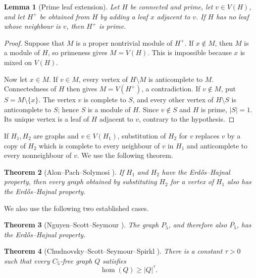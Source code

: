 \documentclass[11pt]{article}
\numberwithin{equation}{section}
\theoremstyle{plain}
\newtheorem{theorem}{Theorem}[section]
\newtheorem{lemma}[theorem]{Lemma}
\theoremstyle{definition}
\begin{document}
\begin{lemma}[Prime leaf extension]
\label{lem:prime-leaf-extension}
Let $H$ be connected and prime, let $v\in V(H)$, and let $H^+$ be
obtained from $H$ by adding a leaf $x$ adjacent to $v$.  If $H$ has no
leaf whose neighbour is $v$, then $H^+$ is prime.
\end{lemma}

\begin{proof}
Suppose that $M$ is a proper nontrivial module of $H^+$.  If $x\notin
M$, then $M$ is a module of $H$, so primeness gives $M=V(H)$.  This is
impossible because $x$ is mixed on $V(H)$.

Now let $x\in M$.  If $v\in M$, every vertex of $H\setminus M$ is
anticomplete to $M$.  Connectedness of $H$ then gives $M=V(H^+)$, a
contradiction.  If $v\notin M$, put $S=M\setminus\{x\}$.  The vertex
$v$ is complete to $S$, and every other vertex of $H\setminus S$ is
anticomplete to $S$; hence $S$ is a module of $H$.  Since $v\notin S$
and $H$ is prime, $|S|=1$.  Its unique vertex is a leaf of $H$ adjacent
to $v$, contrary to the hypothesis.
\end{proof}

If $H_1,H_2$ are graphs and $v\in V(H_1)$, substitution of $H_2$ for
$v$ replaces $v$ by a copy of $H_2$ which is complete to every
neighbour of $v$ in $H_1$ and anticomplete to every nonneighbour of
$v$.  We use the following theorem.

\begin{theorem}[Alon--Pach--Solymosi \cite{AlonPachSolymosi2001}]
\label{thm:APS-substitution}
If $H_1$ and $H_2$ have the Erd\H{o}s--Hajnal property, then every graph
obtained by substituting $H_2$ for a vertex of $H_1$ also has the
Erd\H{o}s--Hajnal property.
\end{theorem}

We also use the following two established cases.

\begin{theorem}[Nguyen--Scott--Seymour
\cite{NguyenScottSeymourP5}]
\label{thm:P5-EH}
The graph $P_5$, and therefore also $\overline{P_5}$, has the
Erd\H{o}s--Hajnal property.
\end{theorem}

\begin{theorem}[Chudnovsky--Scott--Seymour--Spirkl
\cite{ChudnovskyScottSeymourSpirkl2023}]
\label{thm:C5-EH}
There is a constant $\tau>0$ such that every $C_5$-free graph $Q$
satisfies
\[
                  \operatorname{hom}(Q)\geq |Q|^\tau.
\]
\end{theorem}
\end{document}

